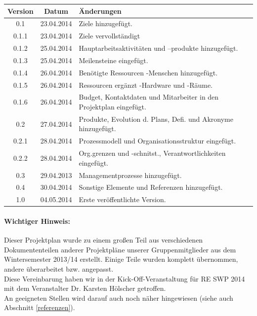 \documentclass[fontsize=12pt,paper=a4,twoside]{scrartcl}
\begin{document}
\begin{tabular}{ccl}
Version & Datum & Änderungen \\
\hline
0.1 & 23.04.2014 & Ziele hinzugefügt.\\
0.1.1 & 23.04.2014 & Ziele vervollständigt\\
0.1.2 & 25.04.2014 & Hauptarbeitsaktivitäten und --produkte hinzugefügt.\\
0.1.3 & 25.04.2014 & Meilensteine eingefügt.\\
0.1.4 & 26.04.2014 & Benötigte Ressourcen -Menschen hinzugefügt.\\
0.1.5 & 26.04.2014 & Ressourcen ergänzt -Hardware und -Räume.\\
0.1.6 & 26.04.2014 & Budget, Kontaktdaten und Mitarbeiter in den Projektplan eingefügt.\\
0.2 & 27.04.2014 &  Produkte, Evolution d. Plans, Defi. und Akronyme hinzugefügt.\\
0.2.1 & 28.04.2014 & Prozessmodell und Organisationsstruktur eingefügt.\\
0.2.2 & 28.04.2014 & Org.grenzen und -schnitst., Verantwortlichkeiten eingefügt.\\
0.3 & 29.04.2013 & Managementprozesse hinzugefügt.\\
0.4 & 30.04.2014 & Sonstige Elemente und Referenzen hinzugefügt.\\
1.0 & 04.05.2014 & Erste veröffentlichte Version. \\
\end{tabular}



\paragraph{Wichtiger Hinweis:} Dieser Projektplan wurde zu einem großen Teil aus verschiedenen Dokumententeilen anderer Projektpläne unserer Gruppenmitglieder aus dem Wintersemester 2013/14 erstellt. Einige Teile wurden komplett übernommen, andere überarbeitet bzw. angepasst. \\
Diese Vereinbarung haben wir in der Kick-Off-Veranstaltung für RE SWP 2014 mit dem Veranstalter Dr. Karsten Hölscher getroffen. \\
An geeigneten Stellen wird darauf auch noch näher hingewiesen (siehe auch Abschnitt \ref{referenzen}).
		
\end{document}
